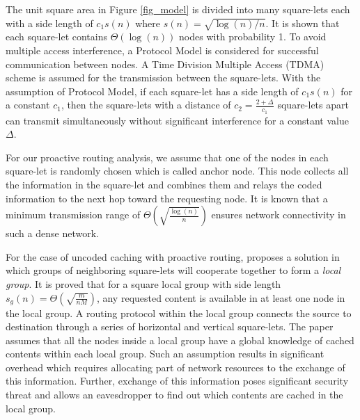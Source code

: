 \documentclass[10pt,journal]{IEEEtran}
\begin{document}


The unit square area in Figure \ref{fig_model} is divided into many square-lets each with a side length of $c_1 s(n)$ where $s(n) = \sqrt{{\log(n)}/{n}}$. It is shown  \cite{DBLP:journals/tit/KulkarniV04} that each square-let contains  $\Theta(\log(n))$ nodes with probability 1. To avoid multiple access interference, a  { Protocol Model} \cite{DBLP:journals/ftnet/XueK06} is considered 
for  successful communication  between nodes. A Time Division Multiple Access (TDMA) scheme is assumed for the transmission between the square-lets. With the assumption of Protocol Model, if each square-let has a side length of $c_1 s(n)$ for a  constant $c_1$, then the square-lets with a distance of $c_2=\frac{2+\Delta}{c_1}$ square-lets apart can transmit simultaneously without significant interference \cite{DBLP:journals/tit/KulkarniV04} for a constant value $\Delta$.

For our proactive routing analysis, we assume that one of the nodes in each square-let is randomly chosen which is called { anchor node}. This node  collects all the information in the  square-let and combines them and relays the coded information to the next hop toward the requesting node. It is known that a minimum transmission range of $\Theta \left(\sqrt{\frac{\log(n)}{n}} \right)$ ensures network connectivity \cite{DBLP:journals/twc/KiskaniAS16} in such a dense network.

For the case of uncoded caching with proactive routing, \cite{DBLP:conf/icc/JeonHJC15} proposes a solution in which groups of neighboring square-lets will cooperate together to form a {\em local group}. It is proved  \cite{DBLP:conf/icc/JeonHJC15} that for a square local group with side length $s_g(n) = \Theta \left(\sqrt{\frac{m}{nM}}\right)$, any requested content is available in at least one node in the local group. A routing protocol \cite{DBLP:journals/tit/KulkarniV04} within the local group connects the source to destination through a series of horizontal and vertical square-lets. The paper assumes that all the nodes inside a local group have a global knowledge of cached contents within each local group. Such an assumption results in significant overhead which requires allocating part of network resources to the exchange of this information. Further, exchange of this information poses significant security threat and allows an eavesdropper to find out which contents are cached in the local group. %
\end{document}
